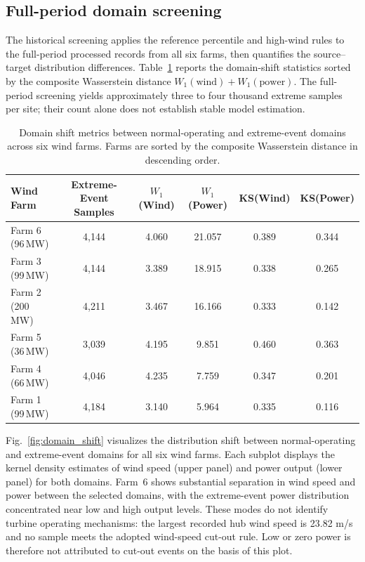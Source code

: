 \subsection{Full-period domain screening}\label{sec:exp1}

The historical screening applies the reference percentile and high-wind rules to the full-period processed records from all six farms, then quantifies the source--target distribution differences. Table~\ref{tab:exp1_shift} reports the domain-shift statistics sorted by the composite Wasserstein distance $W_1(\text{wind}) + W_1(\text{power})$. {\color{blue}The full-period screening yields approximately three to four thousand extreme samples per site; their count alone does not establish stable model estimation.}

\begin{table}[ht]
\centering
\caption{Domain shift metrics between normal-operating and extreme-event domains across six wind farms. Farms are sorted by the composite Wasserstein distance in descending order.}
\setlength{\tabcolsep}{3mm}
\begin{tabular}{lccccc}
\toprule
Wind Farm & Extreme-Event Samples & $W_1$(Wind) & $W_1$(Power) & KS(Wind) & KS(Power) \\
\midrule
Farm 6 (96\,MW)  & 4{,}144 & 4.060 & 21.057 & 0.389 & 0.344 \\
Farm 3 (99\,MW)  & 4{,}144 & 3.389 & 18.915 & 0.338 & 0.265 \\
Farm 2 (200\,MW) & 4{,}211 & 3.467 & 16.166 & 0.333 & 0.142 \\
Farm 5 (36\,MW)  & 3{,}039 & 4.195 &  9.851 & 0.460 & 0.363 \\
Farm 4 (66\,MW)  & 4{,}046 & 4.235 &  7.759 & 0.347 & 0.201 \\
Farm 1 (99\,MW)  & 4{,}184 & 3.140 &  5.964 & 0.335 & 0.116 \\
\bottomrule
\end{tabular}
\label{tab:exp1_shift}
\end{table}

Fig.~\ref{fig:domain_shift} visualizes the distribution shift between normal-operating and extreme-event domains for all six wind farms. Each subplot displays the kernel density estimates of wind speed (upper panel) and power output (lower panel) for both domains. {\color{blue}Farm~6 shows substantial separation in wind speed and power between the selected domains, with the extreme-event power distribution concentrated near low and high output levels. These modes do not identify turbine operating mechanisms: the largest recorded hub wind speed is 23.82 m/s and no sample meets the adopted wind-speed cut-out rule. Low or zero power is therefore not attributed to cut-out events on the basis of this plot.}

